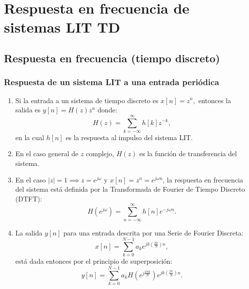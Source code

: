 \chapter{Respuesta en frecuencia de sistemas LIT TD}

\section{Respuesta en frecuencia (tiempo discreto)}

\subsection{Respuesta de un sistema LIT a una entrada peri\'{o}dica}

\begin{enumerate}
	
	\item Si la entrada a un sistema de tiempo discreto es $x[n] = z^n,$ entonces la salida es $y[n] = H(z) z^n$ donde:
	\begin{equation}
		H(z) = \sum_{k=-\infty}^{\infty} h[k] z^{-k},
	\end{equation}
	en la cual $h[n]$ es la respuesta al impulso del sistema LIT.
	
	\item En el caso general de $z$ complejo, $H(z)$ es la funci\'{o}n de transferencia del sistema.
	
	\item En el caso $|z| = 1 \implies z = e^{j\omega}$ y $x[n] = z^n = e^{j\omega n}$, la respuesta en frecuencia del sistema est\'{a} definida por la Transformada de Fourier de Tiempo Discreto (DTFT):
	\begin{equation}
		H(e^{j\omega}) = \sum_{n=-\infty}^{\infty} h[n] e^{-j\omega n}.
	\end{equation}
	
	\item La salida $y[n]$ para una entrada descrita por una Serie de Fourier Discreta:
	\begin{equation}
		x[n] = \sum_{k=0}^{N-1} a_{k} e^{jk\left( \frac{2\pi}{N} \right) n},
	\end{equation}
	est\'{a} dada entonces por el principio de superposición:
	\begin{equation}
		y[n] = \sum_{k=0}^{N-1} a_{k} H\left( e^{j \frac{2\pi k}{N}} \right) e^{jk\left( \frac{2\pi}{N} \right) n}.
	\end{equation}
	
\end{enumerate}

